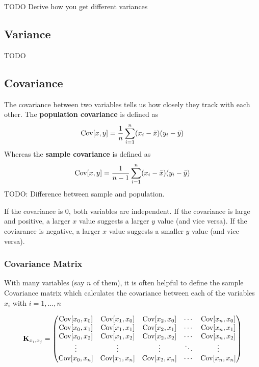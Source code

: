 TODO Derive how you get different variances

\subsection{Variance}
TODO
\subsection{Covariance}
The covariance between two variables tells us how closely they track with each other. The \textbf{population covariance} is defined as 
\begin{align}
\mathrm{Cov}[x,y] = \frac{1}{n}\sum_{i=1}^n (x_i-\bar{x})(y_i-\bar{y})
\end{align}
Whereas the \textbf{sample covariance} is defined as 
\begin{align}
	\mathrm{Cov}[x,y] = \frac{1}{n-1}\sum_{i=1}^n (x_i-\bar{x})(y_i-\bar{y})
\end{align}
TODO: Difference between sample and population.

If the covariance is 0, both variables are independent. If the covariance is large and positive, a larger $x$ value suggests a larger $y$ value (and vice versa). If the coviarance is negative, a larger $x$ value suggests a smaller $y$ value (and vice versa).


\subsubsection{Covariance Matrix}\label{covmat}
With many variables (say $n$ of them), it is often helpful to define the sample Covariance matrix which calculates the covariance between each of the variables $x_i$ with $i = 1,\dots, n$

\begin{align}
\textbf{K}_{x_i,x_j} = \begin{pmatrix} 
                             \mathrm{Cov}[x_0,x_0]&\mathrm{Cov}[x_1,x_0]&\mathrm{Cov}[x_2,x_0]&\cdots &\mathrm{Cov}[x_n,x_0]\\
                             \mathrm{Cov}[x_0,x_1]&\mathrm{Cov}[x_1,x_1]&\mathrm{Cov}[x_2,x_1]&\cdots &\mathrm{Cov}[x_n,x_1]\\
                             \mathrm{Cov}[x_0,x_2]&\mathrm{Cov}[x_1,x_2]&\mathrm{Cov}[x_2,x_2]&\cdots &\mathrm{Cov}[x_n,x_2]\\
                             \vdots&\vdots&\vdots&\ddots&\vdots\\
                             \mathrm{Cov}[x_0,x_n]&\mathrm{Cov}[x_1,x_n]&\mathrm{Cov}[x_2,x_n]&\cdots &\mathrm{Cov}[x_n,x_n] \end{pmatrix}
\end{align}


